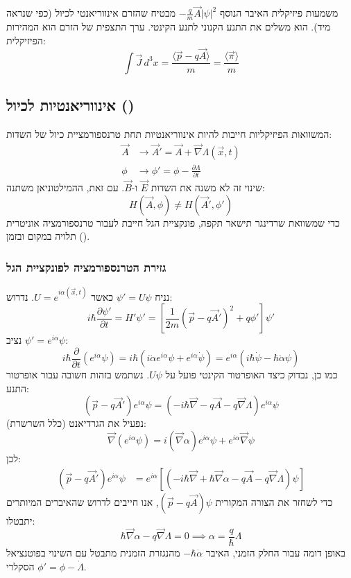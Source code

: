 \begin{theorembox}{משמעות פיזיקלית}
האיבר הנוסף $-\frac{q}{m}\vec{A}|\psi|^2$ מבטיח שהזרם אינווריאנטי לכיול (כפי שנראה מיד). הוא משלים את התנע הקנוני לתנע הקינטי. ערך התצפית של הזרם הוא המהירות הפיזיקלית:
\[
\int \vec{J} \, d^3x = \frac{\langle \vec{p} - q\vec{A} \rangle}{m} = \frac{\langle \vec{\pi} \rangle}{m}
\]
\end{theorembox}

\subsection{אינווריאנטיות לכיול ()}

המשוואות הפיזיקליות חייבות להיות אינווריאנטיות תחת טרנספורמציית כיול של השדות:
\begin{align}
\vec{A} &\to \vec{A}' = \vec{A} + \vec{\nabla}\Lambda(\vec{x},t) \\
\phi &\to \phi' = \phi - \frac{\partial \Lambda}{\partial t}
\end{align}
שינוי זה לא משנה את השדות $\vec{E}$ ו-$\vec{B}$. עם זאת, ההמילטוניאן משתנה:
\[
H(\vec{A}, \phi) \neq H(\vec{A}', \phi')
\]
כדי שמשוואת שרדינגר תישאר תקפה, פונקציית הגל חייבת לעבור טרנספורמציה אוניטרית תלויה במקום ובזמן ().

\subsubsection*{גזירת הטרנספורמציה לפונקציית הגל}
נניח $\psi' = U\psi$ כאשר $U = e^{i\alpha(\vec{x},t)}$. נדרוש:
\begin{equation}
i\hbar \frac{\partial \psi'}{\partial t} = H' \psi' = \left[ \frac{1}{2m}(\vec{p} - q\vec{A}')^2 + q\phi' \right] \psi'
\end{equation}
נציב $\psi' = e^{i\alpha}\psi$:
\[
i\hbar \frac{\partial}{\partial t}(e^{i\alpha}\psi) = i\hbar (i\dot{\alpha} e^{i\alpha}\psi + e^{i\alpha}\dot{\psi}) = e^{i\alpha} (i\hbar \dot{\psi} - \hbar \dot{\alpha}\psi)
\]
כמו כן, נבדוק כיצד האופרטור הקינטי פועל על $U\psi$. נשתמש בזהות חשובה עבור אופרטור התנע:
\begin{equation}
(\vec{p} - q\vec{A}') e^{i\alpha}\psi = (-i\hbar\vec{\nabla} - q\vec{A} - q\vec{\nabla}\Lambda) e^{i\alpha}\psi
\end{equation}
נפעיל את הגרדיאנט (כלל השרשרת):
\[
\vec{\nabla}(e^{i\alpha}\psi) = i(\vec{\nabla}\alpha)e^{i\alpha}\psi + e^{i\alpha}\vec{\nabla}\psi
\]
לכן:
\begin{align}
(\vec{p} - q\vec{A}') e^{i\alpha}\psi &= e^{i\alpha} \left[ (-i\hbar\vec{\nabla} + \hbar\vec{\nabla}\alpha - q\vec{A} - q\vec{\nabla}\Lambda) \psi \right]
\end{align}
כדי לשחזר את הצורה המקורית $(\vec{p}-q\vec{A})\psi$, אנו חייבים לדרוש שהאיברים המיותרים יתבטלו:
\[
\hbar\vec{\nabla}\alpha - q\vec{\nabla}\Lambda = 0 \implies \alpha = \frac{q}{\hbar}\Lambda
\]
באופן דומה עבור החלק הזמני, האיבר $-\hbar \dot{\alpha}$ מהנגזרת הזמנית מתבטל עם השינוי בפוטנציאל הסקלרי $\phi' = \phi - \dot{\Lambda}$.

